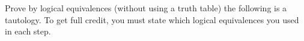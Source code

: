 \documentclass[10pt]{exam}
\begin{document}
\begin{questions}
\question[16] Prove by logical equivalences (without using a truth table) the following is a tautology. To get full credit, you must state which logical equivalences you used in each step.



\end{questions}
\end{document}
